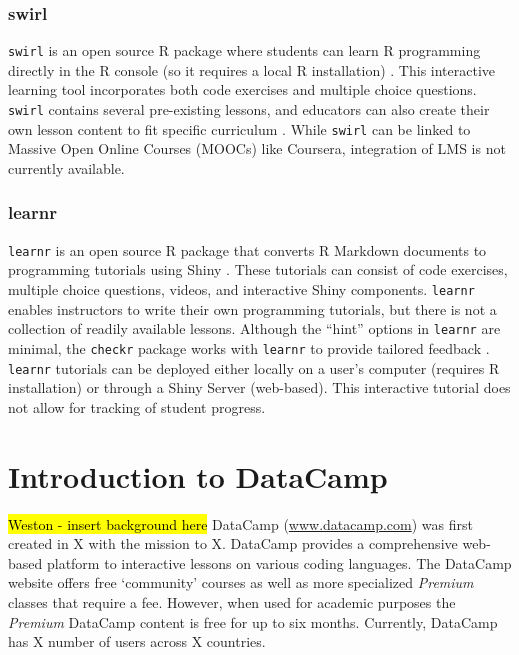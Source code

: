 \documentclass{tise_style_doi}
\begin{document}
\subsubsection{swirl}

\texttt{swirl} is an open source R package where students can learn R programming
directly in the R console (so it requires a local R installation) \citep{Kross}.
This interactive learning tool incorporates both code exercises and multiple choice
questions. \texttt{swirl} contains several pre-existing lessons, and
educators can also create their own lesson content to fit
specific curriculum \citep{Carchedi2014}.  While \texttt{swirl} can be linked to Massive
Open Online Courses (MOOCs) like Coursera, integration of LMS
is not currently available.

\subsubsection{learnr}

\texttt{learnr} is an open source R package that converts R Markdown documents
to programming tutorials using Shiny \citep{GarrettGrolemund2017}.  These
tutorials can consist of code exercises, multiple choice questions, videos,
and interactive Shiny components.  \texttt{learnr} enables instructors to
write their own programming tutorials, but there is not a collection of readily available
lessons.  Although the ``hint'' options in \texttt{learnr}
are minimal, the \texttt{checkr} package works with \texttt{learnr} to provide
tailored feedback \citep{DanielKaplan2018}.  \texttt{learnr} tutorials can be deployed either
locally on a user's computer (requires R installation) or through a Shiny Server (web-based).
This interactive tutorial does not allow for tracking of student progress.



\section{Introduction to DataCamp}

\hl{Weston - insert background here}
DataCamp (\url{www.datacamp.com}) was first created in X with the mission to X.
DataCamp provides a comprehensive web-based platform to interactive lessons on various coding
languages. The DataCamp website offers free `community' courses
as well as more specialized \textit{Premium} classes that require a fee. However, when used
for academic purposes the \textit{Premium} DataCamp content is free for up to six months.
Currently, DataCamp has X number of users across X countries.
\end{document}
